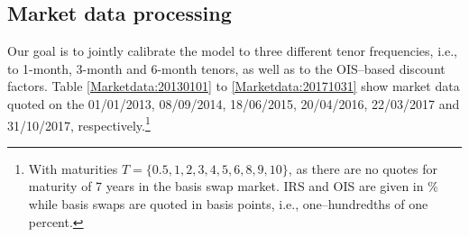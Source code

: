 \documentclass[12pt,a4paper]{article}
\theoremstyle{plain}
\numberwithin{equation}{section}
\begin{document}
%
%
%
\subsection{Market data processing}
Our goal is to jointly calibrate the model to three different tenor frequencies, i.e., to  1-month, 3-month and 6-month tenors, as well as to the OIS--based discount factors. Table \ref{Marketdata:20130101} to \ref{Marketdata:20171031} show market data quoted on the 01/01/2013, 08/09/2014,  18/06/2015, 20/04/2016, 22/03/2017 and 31/10/2017, respectively.\footnote{With maturities $T=\{0.5,1,2,3,4,5,6,8,9,10\}$, as there are no quotes for  maturity of 7 years in the basis swap market. IRS and OIS are given in $\%$ while basis swaps are quoted in basis points, i.e., one--hundredths of one percent.}
\end{document}
